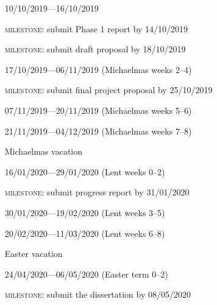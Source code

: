 \documentclass[12pt,a4paper,twoside]{article}
\begin{document}
\begin{enumerate}[leftmargin=*, align=left, font=\bfseries]
\item[10/10/2019—16/10/2019] \hfill \smallskip

\textsc{milestone}: submit Phase 1 report by 14/10/2019

\textsc{milestone}: submit draft proposal by 18/10/2019

\item[17/10/2019—06/11/2019] (Michaelmas weeks 2--4) \hfill \smallskip 

\textsc{milestone}: submit final project proposal by 25/10/2019

\item[07/11/2019—20/11/2019] (Michaelmas weeks 5--6) \hfill \smallskip
 


\item[21/11/2019—04/12/2019] (Michaelmas weeks 7--8) \hfill \smallskip
 


\item[Michaelmas vacation] \hfill \smallskip



\item[16/01/2020—29/01/2020] (Lent weeks 0--2) \hfill \smallskip
 
\textsc{milestone}: submit progress report by 31/01/2020

\item[30/01/2020—19/02/2020] (Lent weeks 3--5) \hfill \smallskip



\item[20/02/2020—11/03/2020] (Lent weeks 6--8) \hfill \smallskip


\item[Easter vacation] \hfill \smallskip


\item[24/04/2020—06/05/2020] (Easter term 0--2)  \hfill \smallskip

\textsc{milestone}: submit the dissertation by 08/05/2020


\end{enumerate}



\end{document}
